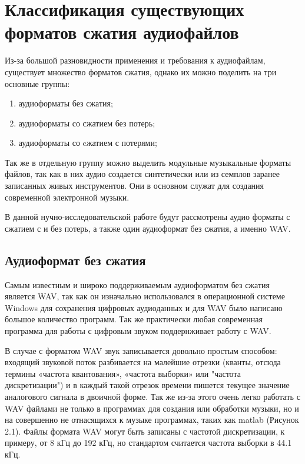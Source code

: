 \documentclass[12pt,a4paper,oneside]{report}
\begin{document}
\chapter{Классификация существующих форматов сжатия аудиофайлов}
\quad
Из-за большой разновидности применения и требования к аудиофайлам, существует множество форматов сжатия, однако их можно поделить на три основные группы:
\begin{enumerate}
	\item аудиоформаты без сжатия;
	\item аудиоформаты со сжатием без потерь;
	\item аудиоформаты со cжатием с потерями;
\end{enumerate} 

Так же в отдельную группу можно выделить модульные музыкальные форматы файлов, так как в них аудио создается синтетически или из семплов заранее записанных живых инструментов. Они в основном служат для создания современной электронной музыки.

В данной нучно-исследовательской работе будут рассмотрены аудио форматы с сжатием с и без потерь, а также один аудиоформат без сжатия, а именно WAV.

\section{Аудиоформат без сжатия}
\quad 
Самым известным и широко поддерживаемым аудиоформатом без сжатия является WAV, так как он изначально использовался в операционной системе Windows для сохранения цифровых аудиоданных и для WAV было написано большое количество программ. Так же практически любая современная программа для работы с цифровым звуком поддернживает работу с WAV. 

В случае с форматом WAV звук записывается довольно простым способом: входящий звуковой поток разбивается на малейшие отрезки (кванты, отсюда термины «частота квантования», «частота выборки» или "частота дискретизации") и в каждый такой отрезок времени пишется текущее значение аналогового сигнала в двоичной форме\cite{six}. Так же из-за этого очень легко работать с WAV файлами не только в программах для создания или обработки музыки, но и на совершенно не отнасящихся к музыке программах, таких как matlab (Рисунок 2.1). Файлы формата WAV могут быть записаны с частотой дискретизации, к примеру, от 8 кГц до 192 кГц, но стандартом считается частота выборки в 44.1 кГц. 
\end{document}
